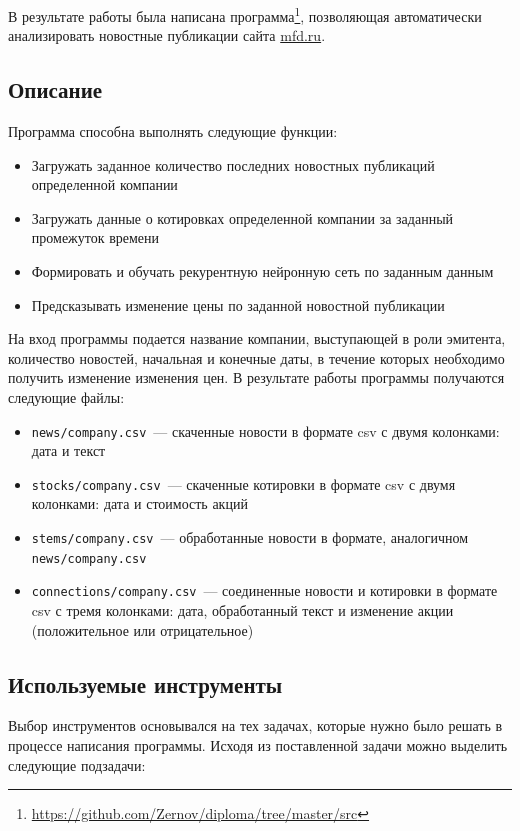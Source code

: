 \documentclass[14pt]{matmex-diploma-custom}
\begin{document}
В результате работы была написана программа\footnote{\url{https://github.com/Zernov/diploma/tree/master/src}}, позволяющая автоматически анализировать новостные публикации сайта \url{mfd.ru}.

\subsection{Описание}

Программа способна выполнять следующие функции:

\begin{itemize}
\item Загружать заданное количество последних новостных публикаций определенной компании
\item Загружать данные о котировках определенной компании за заданный промежуток времени
\item Формировать и обучать рекурентную нейронную сеть по заданным данным
\item Предсказывать изменение цены по заданной новостной публикации
\end{itemize}

На вход программы подается название компании, выступающей в роли эмитента, количество новостей, начальная и конечные даты, в течение которых необходимо получить изменение изменения цен. В результате работы программы получаются следующие файлы:

\begin{itemize}
\item \texttt{news/company.csv}~--- скаченные новости в формате csv с двумя колонками: дата и текст
\item \texttt{stocks/company.csv}~--- скаченные котировки в формате csv с двумя колонками: дата и стоимость акций
\item \texttt{stems/company.csv}~--- обработанные новости в формате, аналогичном \texttt{news/company.csv}
\item \texttt{connections/company.csv}~--- соединенные новости и котировки в формате csv с тремя колонками: дата, обработанный текст и изменение акции (положительное или отрицательное)
\end{itemize}

\subsection{Используемые инструменты}

Выбор инструментов основывался на тех задачах, которые нужно было решать в процессе написания программы. Исходя из поставленной задачи можно выделить следующие подзадачи:
\end{document}
